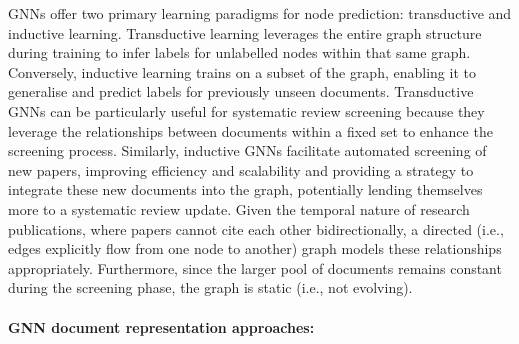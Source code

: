 \documentclass[10pt,oneside]{book}
\begin{document}
GNNs offer two primary learning paradigms for node prediction: transductive and inductive learning. Transductive learning leverages the entire graph structure during training to infer labels for unlabelled nodes within that same graph. Conversely, inductive learning trains on a subset of the graph, enabling it to generalise and predict labels for previously unseen documents. Transductive GNNs can be particularly useful for systematic review screening because they leverage the relationships between documents within a fixed set to enhance the screening process. Similarly, inductive GNNs facilitate automated screening of new papers, improving efficiency and scalability and providing a strategy to integrate these new documents into the graph, potentially lending themselves more to a systematic review update. Given the temporal nature of research publications, where papers cannot cite each other bidirectionally, a directed (i.e., edges explicitly flow from one node to another) graph models these relationships appropriately. Furthermore, since the larger pool of documents remains constant during the screening phase, the graph is static (i.e., not evolving).


\paragraph{GNN document representation approaches: }
\end{document}
